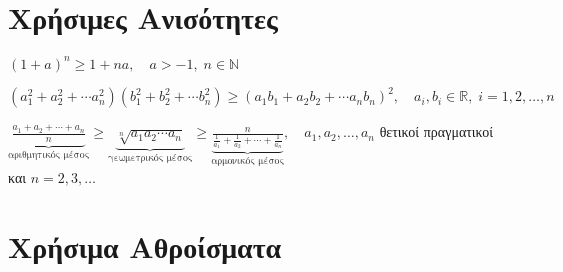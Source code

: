 



\everymath{\displaystyle}
\pagestyle{vangelis}



\setcounter{chapter}{1}

\begin{center}
  \minibox{\Large\bfseries \textcolor{Col1}{Απειροστικός Ι}}
\end{center}

\vspace{2\baselineskip}

\section{Χρήσιμες Ανισότητες}

\begin{myitemize}
  \item $ (1+a)^{n} \geq 1+na, \quad a>-1, \; n \in \mathbb{N} $
  \item $ (a_{1}^{2}+ a_{2}^{2} + \cdots a_{n}^{2})(b_{1}^{2}+ b_{2}^{2}+ \cdots
    b_{n}^{2}) \geq (a_{1} b_{1}+ a_{2} b_{2} + \cdots a_{n} b_{n})^{2}, \quad a_{i},
    b_{i} \in \mathbb{R}, \; i=1,2,\ldots,n $ 
  \item $ \underbrace{\frac{a_{1}+ a_{2}+ \cdots + a_{n}}{n}}_{\text{αριθμητικός μέσος}}
    \geq \underbrace{\sqrt[n]{a_{1} a_{2} \cdots a_{n}}}_{\text{γεωμετρικός μέσος}}
    \geq \underbrace{\frac{n}{\frac{1}{a_{1}}+ \frac{1}{a_{2}} + \cdots +
    \frac{1}{a_{n}}}}_{\text{αρμονικός μέσος}}, \quad
    a_{1}, a_{2}, \ldots, a_{n} $ θετικοί πραγματικοί και $ n=2,3,\ldots $
\end{myitemize}


\section{Χρήσιμα Αθροίσματα}

